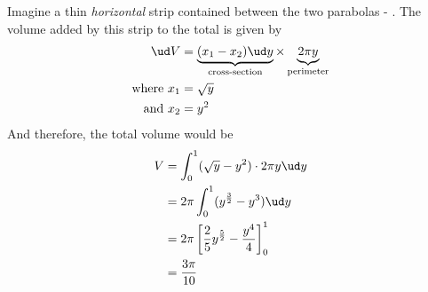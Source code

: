 \begin{solution}[\fullpage]
	Imagine a thin \textit{horizontal} strip contained between the two 
	parabolas - \asif. The  volume added by this strip to the total 
	is given by
	\begin{align}
		\ud V &= \underbrace{(x_1-x_2)\ud y}_{\text{cross-section}}\times
		         \underbrace{2\pi y}_{\text{perimeter}} \\
		\text{where } x_1 &= \sqrt{y} \\
		\text{and } x_2 &= y^2
	\end{align}
	And therefore, the total volume would be
	\begin{align}
		V &= \int_0^1 (\sqrt{y} - y^2)\cdot 2\pi y\ud y \\
		  &= 2\pi\int_0^1 (y^{\frac{3}{2}} - y^3)\ud y \\
		  &= 2\pi\left[ \dfrac{2}{5}y^{\frac{5}{2}} - \dfrac{y^4}{4}\right]_0^1 \\
		  &= \dfrac{3\pi}{10}
	\end{align}
\end{solution}
